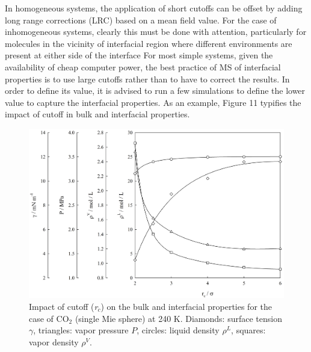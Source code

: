 \documentclass[9pt,bestpractices]{livecoms}
\begin{document}
In homogeneous systems, the application of short cutoffs can be offset by
adding long range corrections (LRC) based on a mean field value. For the case
of inhomogeneous systems, clearly this must be done with attention,
particularly for molecules in the vicinity of interfacial region where
different environments are present at either side of the interface
\citep{lotfi1990,janecek2006,siperstein2002,lishchuk2018}
For most simple systems, given the
availability of cheap computer power, the best practice of MS of interfacial
properties is to use large cutoffs rather than to have to correct the results. In
order to define its value, it is advised to run a few simulations to define the
lower value to capture the interfacial properties. As an example, Figure 11
typifies the impact of cutoff in bulk and interfacial properties. 

\begin{figure}
  \centering
\includegraphics[width=\linewidth]{gfx/fig_11_op3.JPG}
\caption{Impact of cutoff (\textit{r}$_{c}$) on the bulk and interfacial properties for the case of CO$_{2}$ (single Mie sphere) at 240 K. Diamonds: surface tension $\gamma$, triangles: vapor pressure $P$, circles: liquid density $\rho^L$, squares: vapor density $\rho^V$.}
\label{fig:11}
\end{figure}
\end{document}

